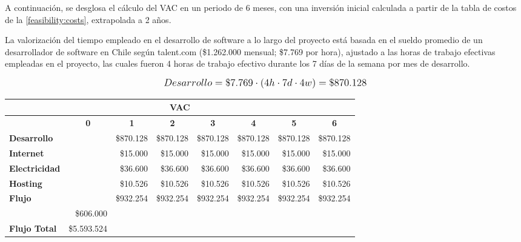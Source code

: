A continuación, se desglosa el cálculo del VAC en un periodo de 6 meses, con una inversión inicial calculada a partir de la tabla de costos de la \autoref{feasibility:costs}, extrapolada a 2 años.

La valorización del tiempo empleado en el desarrollo de software a lo largo del proyecto está basada en el sueldo promedio de un desarrollador de software en Chile según talent.com (\$1.262.000 mensual; \$7.769 por hora), ajustado a las horas de trabajo efectivas empleadas en el proyecto, las cuales fueron 4 horas de trabajo efectivo durante los 7 días de la semana por mes de desarrollo.

\[
\mathlarger{
	Desarrollo = \$7.769 \cdot \left(4h\cdot7d\cdot4w\right) = \$870.128
}
\]

\begin{center}
	\begin{tabular}{ | l | l | l | l | l | l | l | l |}
		\hline
		\multicolumn{8}{|c|}{\textbf{VAC}} \\
		\hline
		 & \multicolumn{1}{|c|}{\textbf{0}} & \multicolumn{1}{|c|}{\textbf{1}} & \multicolumn{1}{|c|}{\textbf{2}} & \multicolumn{1}{|c|}{\textbf{3}} & \multicolumn{1}{|c|}{\textbf{4}} & \multicolumn{1}{|c|}{\textbf{5}} & \multicolumn{1}{|c|}{\textbf{6}} \\
		\hline
		{\textbf{Desarrollo}} &  & \multicolumn{1}{|r|}{\$870.128} & \multicolumn{1}{|r|}{\$870.128} & \multicolumn{1}{|r|}{\$870.128} & \multicolumn{1}{|r|}{\$870.128} & \multicolumn{1}{|r|}{\$870.128} & \multicolumn{1}{|r|}{\$870.128} \\ \hline
		
		{\textbf{Internet}} &  & \multicolumn{1}{|r|}{\$15.000} & \multicolumn{1}{|r|}{\$15.000} & \multicolumn{1}{|r|}{\$15.000} & \multicolumn{1}{|r|}{\$15.000} & \multicolumn{1}{|r|}{\$15.000} & \multicolumn{1}{|r|}{\$15.000} \\ \hline
		
		{\textbf{Electricidad}} &  & \multicolumn{1}{|r|}{\$36.600} & \multicolumn{1}{|r|}{\$36.600} & \multicolumn{1}{|r|}{\$36.600} & \multicolumn{1}{|r|}{\$36.600} & \multicolumn{1}{|r|}{\$36.600} & \multicolumn{1}{|r|}{\$36.600} \\ \hline
		
		{\textbf{Hosting}} &  & \multicolumn{1}{|r|}{\$10.526} & \multicolumn{1}{|r|}{\$10.526} & \multicolumn{1}{|r|}{\$10.526} & \multicolumn{1}{|r|}{\$10.526} & \multicolumn{1}{|r|}{\$10.526} & \multicolumn{1}{|r|}{\$10.526} \\ \hline
		
		{\textbf{Flujo}} &  & \multicolumn{1}{|r|}{\$932.254} & \multicolumn{1}{|r|}{\$932.254} & \multicolumn{1}{|r|}{\$932.254} & \multicolumn{1}{|r|}{\$932.254} & \multicolumn{1}{|r|}{\$932.254} & \multicolumn{1}{|r|}{\$932.254} \\ \hline
		& \multicolumn{1}{|r|}{\$606.000} & & & & & & \\ \hline
		\textbf{Flujo Total} & \multicolumn{1}{|r|}{\$5.593.524} & & & & & & \\ \hline
	\end{tabular}
\end{center}


